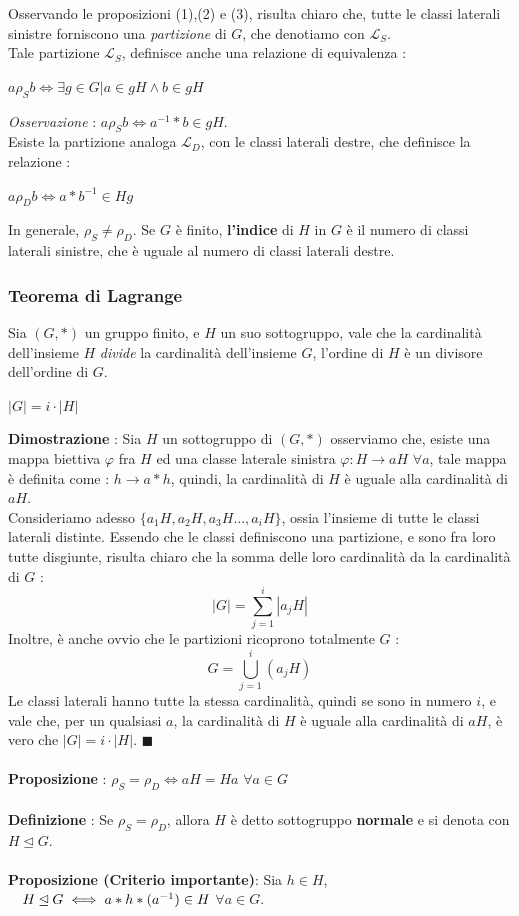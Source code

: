 \documentclass[12pt, letterpaper]{article}
\newcommand{\spaz}{{\text{\hphantom{aa}}}}
\begin{document}
Osservando le proposizioni (1),(2) e (3), risulta chiaro che, tutte le classi laterali sinistre  
forniscono una \textit{partizione} di \(G\), che denotiamo con \(\mathcal{L}_S\).\\
Tale partizione \(\mathcal{L}_S\), definisce anche una relazione di equivalenza : \begin{center}
    \(a\rho_S b\iff \exists g\in G |a\in gH \land b\in gH\)
\end{center}
\textit{Osservazione }:  \(a\rho_S b\iff a^{-1}*b\in gH\). 
\\Esiste la partizione analoga \(\mathcal{L}_D\), con le classi laterali destre, che definisce la relazione :
\begin{center}
    \(a\rho_D b\iff a*b^{-1}\in Hg\)
\end{center}
In generale, \(\rho_S\ne \rho_D\).
Se \(G\) è finito, \textbf{l'indice} di \(H\) in \(G\) è il numero di classi laterali sinistre, che è uguale 
al numero di classi laterali destre.
\subsubsection{Teorema di Lagrange}
Sia \((G,*)\) un gruppo finito, e \(H\) un suo sottogruppo, vale che la cardinalità dell'insieme \(H\) \textit{divide}
la cardinalità dell'insieme \(G\), l'ordine di \(H\) è un divisore dell'ordine di \(G\).\begin{center}
    \(|G|=i\cdot|H|\)
\end{center} 
\textbf{Dimostrazione }: Sia \(H\) un sottogruppo di \((G,*)\) osserviamo che, esiste una mappa biettiva \(\varphi\) 
fra \(H\) ed una classe laterale sinistra \(\varphi:H\rightarrow aH\) \(\forall a\), tale mappa è definita 
come : \(h\rightarrow a*h\), quindi, la cardinalità di \(H\) è uguale alla cardinalità di \(aH\).
\\Consideriamo adesso \(\{a_1H,a_2H,a_3H...,a_iH\}\), ossia l'insieme di tutte le classi 
laterali distinte. Essendo che le classi definiscono una partizione, e sono fra loro tutte disgiunte, 
risulta chiaro che la somma delle loro cardinalità da la cardinalità di \(G\) : \begin{equation}
    |G|=\sum_{j=1}^i|a_jH|
\end{equation}
Inoltre, è anche ovvio che le partizioni ricoprono totalmente \(G\) :
\begin{equation}
    G=\bigcup_{j=1}^i (a_jH)
\end{equation}
Le classi laterali hanno tutte la stessa cardinalità, quindi se sono in numero \(i\), e vale che, per un 
qualsiasi \(a\), la cardinalità di \(H\) è uguale alla cardinalità di \(aH\), è vero che \(|G|=i\cdot|H|\). \(\blacksquare\)
\\\hphantom{}\\
\textbf{Proposizione }: \(\rho_S=\rho_D \iff aH=Ha\)  \(\forall a\in G\)
\\\hphantom{}\\
\textbf{Definizione }: Se \(\rho_S=\rho_D\), allora \(H\) è detto sottogruppo \textbf{normale} e si denota con \(H\unlhd G\).
\\\hphantom{}\\
\textbf{Proposizione \color{red}(Criterio importante)\color{black}}: Sia \(h\in H\), \(\spaz H\unlhd G\iff a*h*(a^{-1})\in H \)  \(\forall a\in G\).
\end{document}
